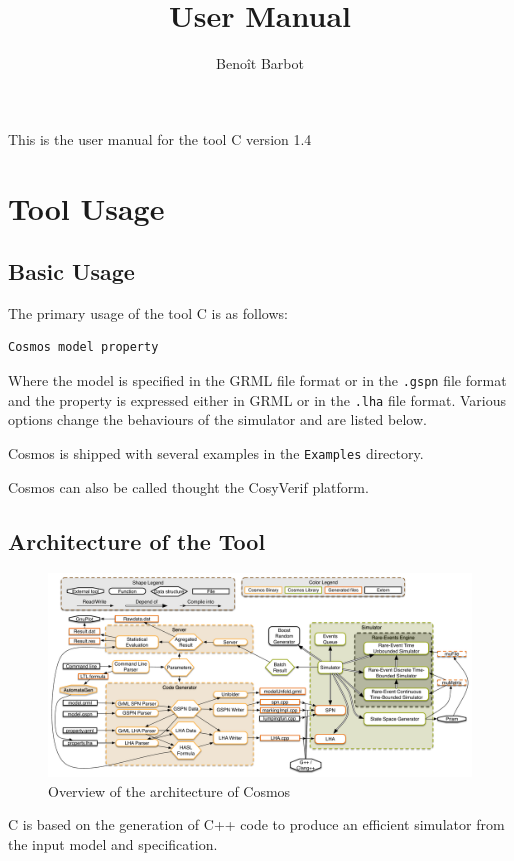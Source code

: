 \documentclass{article}
\title{\cosmos{} User Manual}
\author{Beno\^it Barbot}
\newcommand{\cosmos}{\mbox{\textup{C}\scalebox{0.75}{{\textsc{OSMOS}}}}}
\begin{document}
\maketitle


This is the user manual for the tool \cosmos{} version 1.4

\section{Tool Usage}

\subsection{Basic Usage}
The primary usage of the tool \cosmos{} is as follows:
\begin{verbatim}
Cosmos model property
\end{verbatim}
Where the model is specified in the GRML file format or in the
\verb|.gspn| file format and the property is expressed either in GRML
or in the \verb|.lha| file format. Various options change the behaviours 
of the simulator and are listed below.

Cosmos is shipped with several examples in the \verb|Examples| directory.

Cosmos can also be called thought the CosyVerif platform.




\subsection{Architecture of the Tool}
\begin{figure}[ht]
  \centering
  \includegraphics[width=\textwidth]{overviewcosmos}
  \caption{Overview of the architecture of Cosmos}
  \label{fig:overviewCosmos}
\end{figure}

\cosmos{} is based on the generation of C++ code to produce an efficient
simulator from the input model and specification. 
\end{document}
